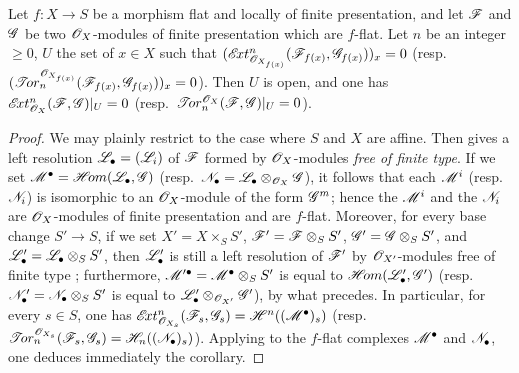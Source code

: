 \begin{corollary}[12.3.4]
\label{IV.12.3.4}
Let $f:X\to S$ be a morphism flat and locally of finite presentation, and let $\mathscr{F}$ and $\mathscr{G}$ be two $\mathscr{O}_X$-modules of finite presentation which are $f$-flat.
Let $n$ be an integer $\geq 0$, $U$ the set of $x\in X$ such that $(\mathscr{E}\!xt^n_{\mathscr{O}_{X_{f(x)}}}(\mathscr{F}_{f(x)},\mathscr{G}_{f(x)}))_x=0$ \textup{(resp.\ $(\mathscr{T}\!or_n^{\mathscr{O}_{X_{f(x)}}}(\mathscr{F}_{f(x)},\mathscr{G}_{f(x)}))_x=0$)}.
Then $U$ is open, and one has
$\mathscr{E}\!xt^n_{\mathscr{O}_X}(\mathscr{F},\mathscr{G})|_U=0$
\textup{(resp.\ $\mathscr{T}\!or_n^{\mathscr{O}_X}(\mathscr{F},\mathscr{G})|_U=0$)}.
\end{corollary}

\begin{proof}
We may plainly restrict to the case where $S$ and $X$ are affine.
Then  gives a left resolution $\mathscr{L}_\bullet=(\mathscr{L}_i)$ of $\mathscr{F}$ formed by $\mathscr{O}_X$-modules \emph{free of finite type}.
If we set $\mathscr{M}^\bullet=\mathscr{H}\!om(\mathscr{L}_\bullet,\mathscr{G})$ (resp.\ $\mathscr{N}_\bullet=\mathscr{L}_\bullet\otimes_{\mathscr{O}_X}\mathscr{G}$), it follows that each $\mathscr{M}^i$ (resp.\ $\mathscr{N}_i$) is isomorphic to an $\mathscr{O}_X$-module of the form $\mathscr{G}^m$; hence the $\mathscr{M}^i$ and the $\mathscr{N}_i$ are $\mathscr{O}_X$-modules of finite presentation and are $f$-flat.
Moreover, for every base change $S'\to S$, if we set
$X'=X\times_S S'$, $\mathscr{F}'=\mathscr{F}\otimes_S S'$, $\mathscr{G}'=\mathscr{G}\otimes_S S'$, and
$\mathscr{L}'_\bullet=\mathscr{L}_\bullet\otimes_S S'$, then $\mathscr{L}'_\bullet$ is still a left resolution of $\mathscr{F}'$ by $\mathscr{O}_{X'}$-modules free of finite type ; furthermore,
$\mathscr{M}'^\bullet=\mathscr{M}^\bullet\otimes_S S'$ is equal to $\mathscr{H}\!om(\mathscr{L}'_\bullet,\mathscr{G}')$
(resp.\ $\mathscr{N}'_\bullet=\mathscr{N}_\bullet\otimes_S S'$ is equal to $\mathscr{L}'_\bullet\otimes_{\mathscr{O}_{X'}}\mathscr{G}'$), by what precedes.
In particular, for every $s\in S$, one has
$\mathscr{E}\!xt^n_{\mathscr{O}_{X_s}}(\mathscr{F}_s,\mathscr{G}_s)=\mathscr{H}^n((\mathscr{M}^\bullet)_s)$
(resp.\ $\mathscr{T}\!or_n^{\mathscr{O}_{X_s}}(\mathscr{F}_s,\mathscr{G}_s)=\mathscr{H}_n((\mathscr{N}_\bullet)_s)$).
Applying  to the $f$-flat complexes $\mathscr{M}^\bullet$ and $\mathscr{N}_\bullet$, one deduces immediately the corollary.
\end{proof}
